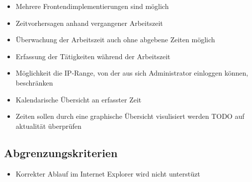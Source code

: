 \begin{itemize}
	\item Mehrere Frontendimplementierungen sind möglich
	\item Zeitvorhersagen anhand vergangener Arbeitszeit
	\item Überwachung der Arbeitszeit auch ohne abgebene Zeiten möglich
	\item Erfassung der Tätigkeiten während der Arbeitszeit
	\item Möglichkeit die IP-Range, von der aus sich Administrator einloggen können, beschränken
	\item Kalendarische Übersicht an erfasster Zeit
	\item Zeiten sollen durch eine graphische Übersicht visulisiert werden TODO auf aktualität überprüfen
\end{itemize}


\subsection{Abgrenzungskriterien}
\begin{itemize}
	\item Korrekter Ablauf im Internet Explorer wird nicht unterstüzt
\end{itemize}
